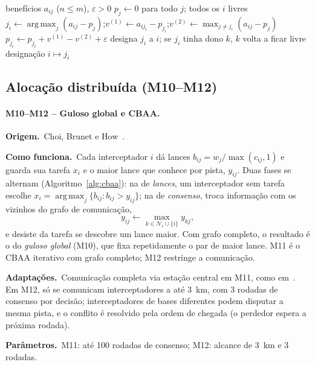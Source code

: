 \documentclass[11pt,a4paper]{article}
\newcommand{\orig}{\par\noindent\textbf{Origem.}~}
\newcommand{\func}{\par\noindent\textbf{Como funciona.}~}
\newcommand{\adap}{\par\noindent\textbf{Adaptações.}~}
\newcommand{\parm}{\par\noindent\textbf{Parâmetros.}~}
\DeclareMathOperator*{\argmax}{arg\,max}
\begin{document}
\begin{algorithm}[t]
\caption{Leilão direto para atribuição assimétrica (M9).}\label{alg:leilao}
\begin{algorithmic}[1]
\Require benefícios $a_{ij}$ ($n\le m$), $\varepsilon>0$
\State $p_j\gets0$ para todo $j$; todos os $i$ livres
  \State $j_i\gets\argmax_j(a_{ij}-p_j)$;\quad $v^{(1)}\gets a_{ij_i}-p_{j_i}$;\quad $v^{(2)}\gets\max_{j\ne j_i}(a_{ij}-p_j)$
  \State $p_{j_i}\gets p_{j_i}+v^{(1)}-v^{(2)}+\varepsilon$
  \State designa $j_i$ a $i$; se $j_i$ tinha dono $k$, $k$ volta a ficar livre
\EndWhile
\Ensure designação $i\mapsto j_i$
\end{algorithmic}
\end{algorithm}

\subsection{Alocação distribuída (M10--M12)}

\paragraph{M10--M12 -- Guloso global e CBAA.}
\orig Choi, Brunet e How~\cite{choi2009}.
\func Cada interceptador $i$ dá lances $b_{ij}=w_j/\max(c_{ij},1)$ e guarda sua tarefa $x_i$ e o maior lance que conhece
por pista, $y_{ij}$. Duas fases se alternam (Algoritmo~\ref{alg:cbaa}): na de \emph{lances}, um interceptador sem tarefa
escolhe $x_i=\argmax_j\{b_{ij}:b_{ij}>y_{ij}\}$; na de \emph{consenso}, troca informação com os vizinhos do grafo de
comunicação,
\begin{equation}
  y_{ij}\leftarrow\max_{k\in\mathcal{N}_i\cup\{i\}}y_{kj},
  \label{eq:consenso}
\end{equation}
e desiste da tarefa se descobre um lance maior. Com grafo completo, o resultado é o do \emph{guloso global} (M10), que
fixa repetidamente o par de maior lance. M11 é o CBAA iterativo com grafo completo; M12 restringe a comunicação.
\adap Comunicação completa via estação central em M11, como em~\cite{feitosa2025}. Em M12, só se comunicam
interceptadores a até 3~km, com 3 rodadas de consenso por decisão; interceptadores de bases diferentes podem disputar a
mesma pista, e o conflito é resolvido pela ordem de chegada (o perdedor espera a próxima rodada).
\parm M11: até 100 rodadas de consenso; M12: alcance de 3~km e 3 rodadas.
\end{document}
